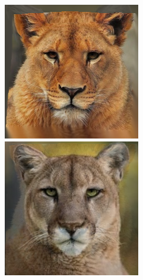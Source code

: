 \documentclass[conference]{IEEEtran}
\begin{document}
\begin{figure}[H]
\begin{multicols}{3}
    \includegraphics[width=1.0\linewidth]{results/cats/XL/img10.png} \par
    \includegraphics[width=1.0\linewidth]{results/cats/XL/img40.png} \par


\end{multicols}
\end{figure}
\end{document}

